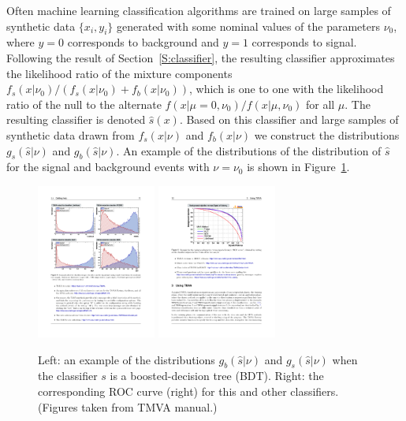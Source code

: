 \documentclass[11pt, oneside]{article}   	%
\begin{document}
Often machine learning classification algorithms are trained on large samples of synthetic data $\{x_i, y_i\}$ generated with some nominal values of the parameters $\nu_0$, where $y=0$ corresponds to background and $y=1$ corresponds to signal. Following the result of Section~\ref{S:classifier}, the resulting classifier approximates the likelihood ratio of the mixture components $f_s(x|\nu_0)/(f_s(x|\nu_0)+f_b(x|\nu_0))$, which is one to one with the likelihood ratio of the null to the alternate $f(x|\mu=0,\nu_0)/f(x|\mu,\nu_0)$ for all $\mu$. The resulting classifier is denoted $\hat s(x)$. Based on this classifier and large samples of synthetic data drawn from $f_s(x | \nu)$ and $f_b(x | \nu)$ we construct the distributions  $g_s(\hat s | \nu)$ and $g_b(\hat s | \nu)$. An example of the distributions of the distribution of $\hat s$ for the signal and background events with $\nu=\nu_0$ is shown in Figure~\ref{fig:tmva}.


\begin{figure}[htbp]
\begin{center}
 \includegraphics[height=2in]{example-TMVA-BDT.pdf}
 \includegraphics[height=2in]{example-TMVA-ROC.pdf}
\caption{Left: an example of the distributions $g_b(\hat s|\nu)$ and $g_s(\hat s|\nu)$ when the classifier $s$ is a boosted-decision tree (BDT). Right: the corresponding ROC curve (right) for this and other classifiers. (Figures taken from TMVA manual.)}
\label{fig:tmva}
\end{center}
\end{figure}
\bigskip
\end{document}
